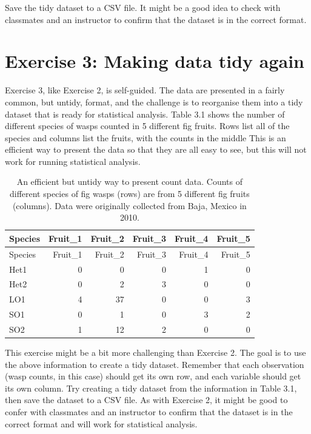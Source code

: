 \documentclass[
]{scrbook}
\begin{document}
Save the tidy dataset to a CSV file.
It might be a good idea to check with classmates and an instructor to confirm that the dataset is in the correct format.

\hypertarget{exercise-3-making-data-tidy-again}{%
\section{Exercise 3: Making data tidy again}\label{exercise-3-making-data-tidy-again}}

Exercise 3, like Exercise 2, is self-guided.
The data are presented in a fairly common, but untidy, format, and the challenge is to reorganise them into a tidy dataset that is ready for statistical analysis.
Table 3.1 shows the number of different species of wasps counted in 5 different fig fruits.
Rows list all of the species and columns list the fruits, with the counts in the middle
This is an efficient way to present the data so that they are all easy to see, but this will not work for running statistical analysis.

\begin{longtable}[]{@{}lrrrrr@{}}
\caption{\label{tab:unnamed-chunk-14}An efficient but untidy way to present count data. Counts of different species of fig wasps (rows) are from 5 different fig fruits (columns). Data were originally collected from Baja, Mexico in 2010.}\tabularnewline
\toprule
Species & Fruit\_1 & Fruit\_2 & Fruit\_3 & Fruit\_4 & Fruit\_5 \\
\midrule
\endfirsthead
\toprule
Species & Fruit\_1 & Fruit\_2 & Fruit\_3 & Fruit\_4 & Fruit\_5 \\
\midrule
\endhead
Het1 & 0 & 0 & 0 & 1 & 0 \\
Het2 & 0 & 2 & 3 & 0 & 0 \\
LO1 & 4 & 37 & 0 & 0 & 3 \\
SO1 & 0 & 1 & 0 & 3 & 2 \\
SO2 & 1 & 12 & 2 & 0 & 0 \\
\bottomrule
\end{longtable}

This exercise might be a bit more challenging than Exercise 2.
The goal is to use the above information to create a tidy dataset.
Remember that each observation (wasp counts, in this case) should get its own row, and each variable should get its own column.
Try creating a tidy dataset from the information in Table 3.1, then save the dataset to a CSV file.
As with Exercise 2, it might be good to confer with classmates and an instructor to confirm that the dataset is in the correct format and will work for statistical analysis.
\end{document}
